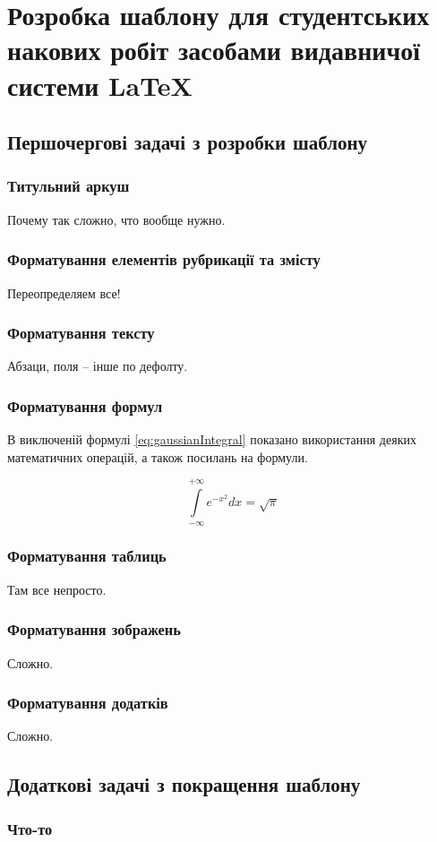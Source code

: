 \chapter{Розробка шаблону для студентських накових робіт засобами видавничої системи \LaTeX{}} 
\label{chap:second}

\section{Першочергові задачі з розробки шаблону}

\subsection{Титульний аркуш}

Почему так сложно, что вообще нужно.

\subsection{Форматування елементів рубрикації та змісту}

Переопределяем все!

\subsection{Форматування тексту}
Абзаци, поля -- інше по дефолту.

\subsection{Форматування формул}
В виключеній формулі \ref{eq:gaussianIntegral} показано використання деяких математичних операцій, а також посилань на формули.

\begin{equation}
\label{eq:gaussianIntegral}
\int\limits^{+\infty}_{-\infty} e^{-x^2} dx = \sqrt{\pi} 
\end{equation}

\subsection{Форматування таблиць}
Там все непросто.

\subsection{Форматування зображень}

Сложно.

\subsection{Форматування додатків}

Сложно.

\section{Додаткові задачі з покращення шаблону}

\subsection{Что-то}
